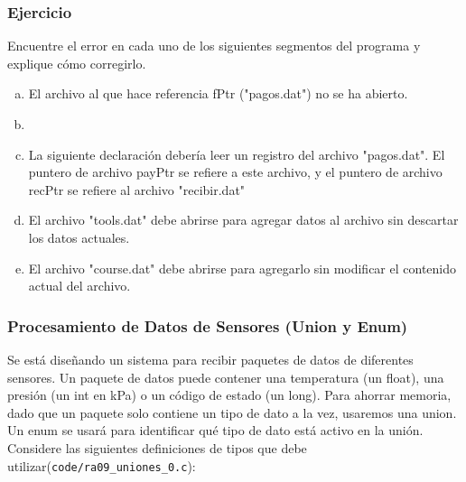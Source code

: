 \subsubsection{Ejercicio}
Encuentre el error en cada uno de los siguientes segmentos del programa y explique cómo corregirlo.
\begin{enumerate}[a)]
  \item El archivo al que hace referencia fPtr ("pagos.dat") no se ha abierto.
    \lstset{inputencoding=utf8/latin1}
    
  \item \ \ \ 
    
  \item La siguiente declaración debería leer un registro del archivo "pagos.dat". 
    El puntero de archivo payPtr se refiere a este archivo, y el puntero de archivo recPtr se refiere al archivo "recibir.dat"
    
  \item El archivo "tools.dat" debe abrirse para agregar datos al archivo sin descartar los datos actuales.
    
  \item El archivo "course.dat" debe abrirse para agregarlo sin modificar el contenido actual del archivo.
    
\end{enumerate}

\subsubsection{Procesamiento de Datos de Sensores (Union y Enum)}
Se está diseñando un sistema para recibir paquetes de datos de diferentes sensores. Un paquete de datos puede contener una temperatura (un float), una presión (un int en kPa) o un código de estado (un long). Para ahorrar memoria, dado que un paquete solo contiene un tipo de dato a la vez, usaremos una union. Un enum se usará para identificar qué tipo de dato está activo en la unión.
Considere las siguientes definiciones de tipos que debe utilizar(\texttt{code/ra09\_uniones\_0.c}):


